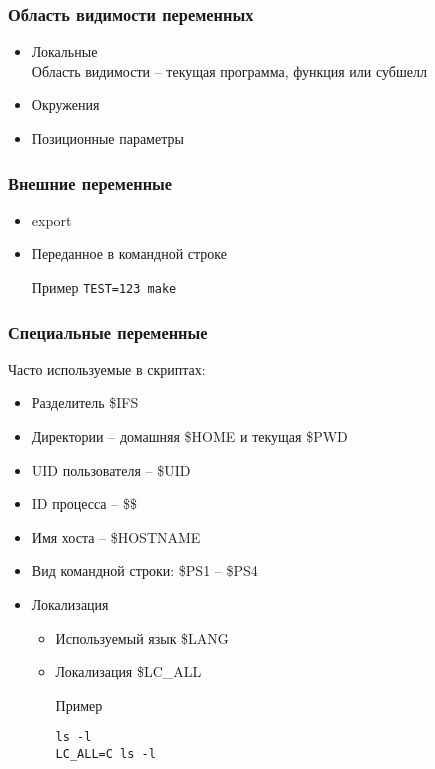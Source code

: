 \begin{frame}
	\frametitle{Область видимости переменных}
	\begin{itemize}
		\item Локальные\\
		    Область видимости -- текущая программа, функция или субшелл
		\item Окружения
		\item Позиционные параметры
	\end{itemize}

\end{frame}



\begin{frame}
	\frametitle{Внешние переменные}


	\begin{itemize}
		\item export
		\item Переданное в командной строке \\
			\begin{block}{Пример}
				{\tt TEST=123 make}
			\end{block}
	\end{itemize}
\end{frame}


\begin{frame}[fragile]
	\frametitle{Специальные переменные}

	Часто используемые в скриптах:

	\begin{itemize}
		\item Разделитель \$IFS
		\item Директории -- домашняя \$HOME и текущая \$PWD
		\item UID пользователя -- \$UID
		\item ID процесса -- \$\$
		\item Имя хоста -- \$HOSTNAME
		\item Вид командной строки: \$PS1 -- \$PS4
		\item Локализация
			\begin{itemize}
				\item Используемый язык \$LANG
				\item Локализация \$LC\_ALL
					\begin{block}{Пример}
						\begin{lstlisting}
ls -l 
LC_ALL=C ls -l
						\end{lstlisting}
					\end{block}
			\end{itemize}
	\end{itemize}

\end{frame}



